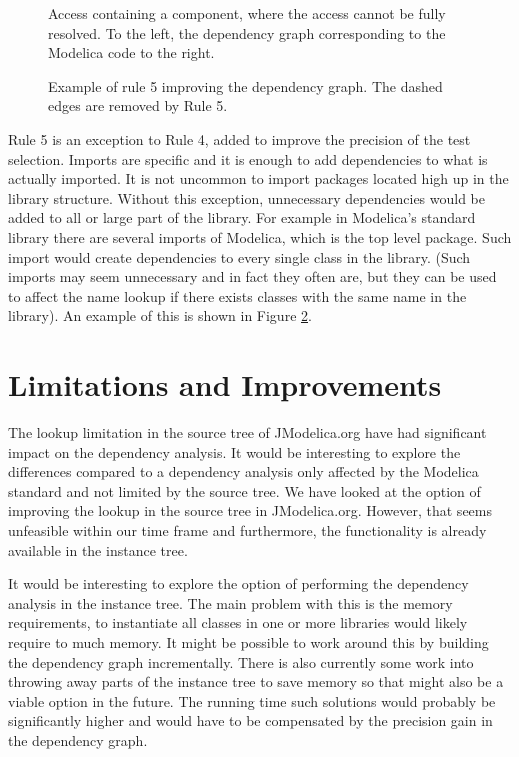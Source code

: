 \documentclass{cslthse-msc}
\begin{document}
\begin{figure}[!htbp]
    \centering
    \qquad
    \subfloat{\raisebox{4.0 cm}{}}
    \caption{Access containing a component, where the access cannot be fully resolved. To the left, the dependency graph corresponding to the Modelica code to the right.}
    \label{fig:brokenAccess}
\end{figure}

\begin{figure}[!htbp]
    \centering
    \qquad
    \subfloat{\raisebox{4.0 cm}{}}
    \caption{Example of rule 5 improving the dependency graph. The dashed edges are removed by Rule 5.}
    \label{fig:rule5}
\end{figure}

Rule 5 is an exception to Rule 4, added to improve the precision of the test selection. Imports are specific and it is enough to add dependencies to what is actually imported. It is not uncommon to import packages located high up in the library structure. Without this exception, unnecessary dependencies would be added to all or large part of the library. For example in Modelica's standard library there are several imports of Modelica, which is the top level package. Such import would create dependencies to every single class in the library. (Such imports may seem unnecessary and in fact they often are, but they can be used to affect the name lookup if there exists classes with the same name in the library). An example of this is shown in Figure \ref{fig:rule5}.

\section{Limitations and Improvements}
The lookup limitation in the source tree of JModelica.org have had significant impact on the dependency analysis. It would be interesting to explore the differences compared to a dependency analysis only affected by the Modelica standard and not limited by the source tree. We have looked at the option of improving the lookup in the source tree in JModelica.org. However, that seems unfeasible within our time frame and furthermore, the functionality is already available in the instance tree.

It would be interesting to explore the option of performing the dependency analysis in the instance tree. The main problem with this is the memory requirements, to instantiate all classes in one or more libraries would likely require to much memory. It might be possible to work around this by building the dependency graph incrementally. There is also currently some work into throwing away parts of the instance tree to save memory so that might also be a viable option in the future. The running time such solutions would probably be significantly higher and would have to be compensated by the precision gain in the dependency graph. 
\end{document}
